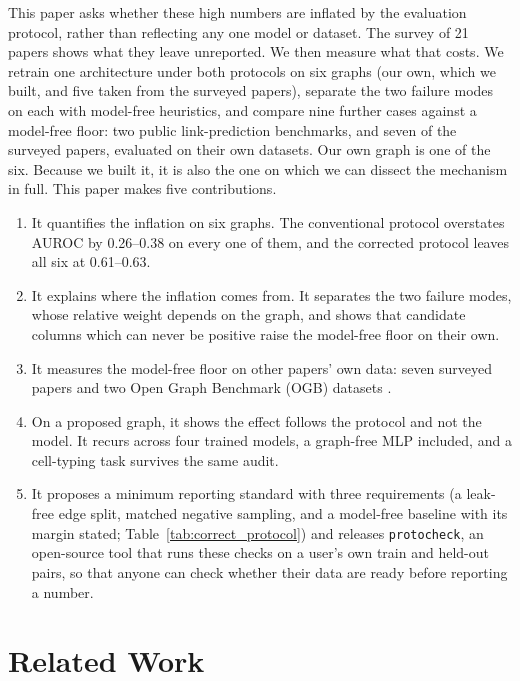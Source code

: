 \documentclass[review]{elsarticle}
\begin{document}
This paper asks whether these high numbers are inflated by the evaluation protocol, rather
than reflecting any one model or dataset. The survey of 21 papers shows what they leave
unreported. We then measure what that costs. We retrain one architecture under both
protocols on six graphs (our own, which we built, and five taken from the surveyed
papers), separate the two failure modes on each with model-free heuristics, and compare nine
further cases against a model-free floor: two public link-prediction benchmarks, and seven
of the surveyed papers, evaluated on their own datasets. Our own graph is one of the six.
Because we built it, it is also the one on which we can dissect the mechanism in full.
This paper makes five contributions.
\begin{enumerate}
\item It quantifies the inflation on six graphs. The conventional protocol overstates AUROC by
0.26--0.38 on every one of them, and the corrected protocol leaves all six at 0.61--0.63.
\item It explains where the inflation comes from. It separates the two failure modes, whose
relative weight depends on the graph, and shows that candidate columns which can never be
positive raise the model-free floor on their own.
\item It measures the model-free floor on other papers' own data: seven surveyed papers and
two Open Graph Benchmark (OGB) datasets \cite{hu2020ogb}.
\item On a proposed graph, it shows the effect follows the
protocol and not the model. It recurs across four trained models, a graph-free MLP
included, and a cell-typing task survives the same audit.
\item It proposes a minimum reporting standard with three requirements (a leak-free edge
split, matched negative sampling, and a model-free baseline with its margin stated;
Table~\ref{tab:correct_protocol}) and releases \texttt{protocheck}, an open-source tool
that runs these checks on a user's own train and held-out pairs, so that anyone can check
whether their data are ready before reporting a number.
\end{enumerate}

\section{Related Work}
\label{sec:related}
\end{document}
